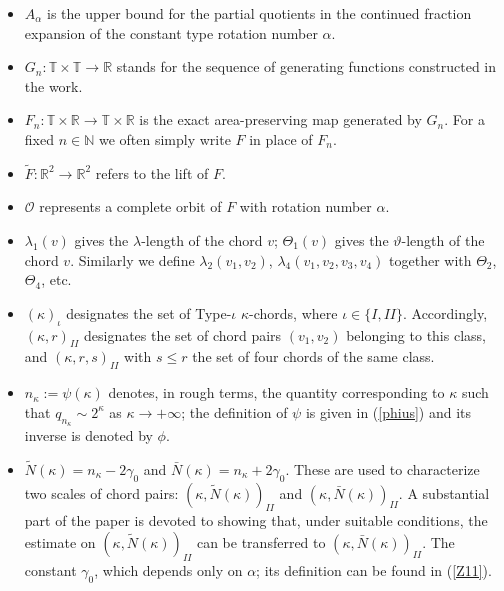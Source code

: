 \documentclass{amsart}
\newcounter{item}[section]
\theoremstyle{definition}
\begin{document}
\begin{itemize}
	\item \(A_\alpha\) is the upper bound for the partial quotients in the continued fraction expansion of the constant type rotation number \(\alpha\).
	
	\item \(G_n : \mathbb{T}\times\mathbb{T}\to\mathbb{R}\) stands for the sequence of generating functions constructed in the work.
	
	\item \(F_n : \mathbb{T}\times\mathbb{R}\to\mathbb{T}\times\mathbb{R}\) is the exact area-preserving map generated by \(G_n\). For a fixed \(n\in\mathbb{N}\) we often simply write \(F\) in place of \(F_n\).
	
	\item \(\widetilde{F} : \mathbb{R}^2\to\mathbb{R}^2\) refers to the lift of \(F\).
	
	\item \(\mathcal{O}\) represents a complete orbit of \(F\) with rotation number \(\alpha\).
	
	\item \(\lambda_1(v)\) gives the \(\lambda\)-length of the chord \(v\); \(\Theta_1(v)\) gives the \(\vartheta\)-length of the chord \(v\). Similarly we define \(\lambda_2(v_1,v_2)\), \(\lambda_4(v_1,v_2,v_3,v_4)\) together with \(\Theta_2\), \(\Theta_4\), etc.
	
	
	
	\item \((\kappa)_{\iota}\) designates the set of Type-\(\iota\) \(\kappa\)-chords, where \(\iota\in\{I,II\}\). Accordingly, \((\kappa,r)_{II}\) designates the set of chord pairs \((v_1,v_2)\) belonging to this class, and \((\kappa,r,s)_{II}\) with $s\leq r$ the set of four chords of the same class.
	
	\item $n_\kappa:=\psi(\kappa)$ denotes, in rough terms, the quantity corresponding to $\kappa$ such that $q_{n_\kappa}\sim 2^\kappa$ as $\kappa\to+\infty$; the  definition of $\psi$ is given in (\ref{phius}) and its inverse is denoted by $\phi$.
	
	\item $\tilde{N}(\kappa)=n_\kappa-2\gamma_0$ and $\bar{N}(\kappa)=n_\kappa+2\gamma_0$. These are used to characterize two scales of chord pairs: $(\kappa,\tilde{N}(\kappa))_{II}$ and $(\kappa,\bar{N}(\kappa))_{II}$. A substantial part of the paper is devoted to showing that, under suitable conditions, the estimate on $(\kappa,\tilde{N}(\kappa))_{II}$ can be transferred to $(\kappa,\bar{N}(\kappa))_{II}$. The constant $\gamma_0$, which depends only on $\alpha$; its definition can be found in (\ref{Z11}).
	

\end{itemize}
\end{document}
